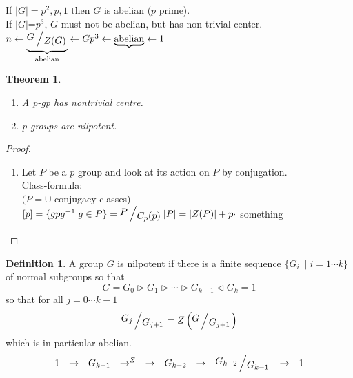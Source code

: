 \documentclass{article}
\let\ddd\cdots
\newcommand{\quotient}[2]{{\raisebox{.2em}{$#1$}\left/\raisebox{-.2em}{$#2$}\right.}}
\newcommand{\abs}[1]{\left|#1\right|}
\newtheorem{theorem}{Theorem}[section]
\theoremstyle{definition}
\newtheorem{definition}{Definition}[section]
\theoremstyle{remark}
\theoremstyle{example}
\begin{document}
	If $\abs{G} = p^2, p, 1$ then $G$ is abelian ($p$ prime).\\
	If $\abs{G}$=$p^3$, $G$ must not be abelian, but has non trivial center.\\
	$n \leftarrow \underbrace{\quotient{G}{Z(G)}}_\mathrm{abelian} \leftarrow G{p^3} \leftarrow \underbrace{\mathrm{abelian}} \leftarrow 1$

	\begin{theorem}
		\begin{enumerate}\ 
			\item A p-gp has nontrivial centre.
			\item p groups are nilpotent.
		\end{enumerate}
	\end{theorem}
	\begin{proof}
		\begin{enumerate}
			\item Let $P$ be a $p$ group and look at its action on $P$ by conjugation.\\
			Class-formula:\\
			$(P=\cup$ conjugacy classes)\\
			$[p]=\{gpg^{-1}|g \in P \} = \quotient{P}{C_p(p)}\\
			\abs{P}=\abs{Z(P)}+p\cdot$ something
		\end{enumerate}
	\end{proof}

	\begin{definition}
		A group $G$ is nilpotent if there is a finite sequence $\{G_i \ \mid i=1 \ddd k\}$ of normal subgroups so that \[ G=G_0 \triangleright G_1 \triangleright \ddd \triangleright G_{k-1} \triangleleft G_k = 1 \] so that for all $j=0 \ddd k-1$
		\[ \quotient{G_j}{G_{j+1}} = Z \left(\quotient{G}{G_{j+1}}\right) \]
		which is in particular abelian.
		\[
		\begin{matrix}
			1 & \to & G_{k-1} & \to^Z &\to &G_{k-2} &\to & \quotient{G_{k-2}}{G_{k-1}} &\to &1
		\end{matrix}
		\]
	\end{definition}
\end{document}
